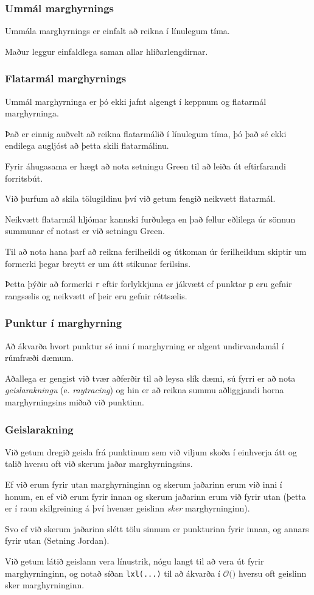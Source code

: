 {
	\frametitle{Ummál marghyrnings}
	{
		\item<1-> Ummála marghyrnings er einfalt að reikna í línulegum tíma.
		\item<2-> Maður leggur einfaldlega saman allar hliðarlengdirnar.
		\item<3->[] 
	}
}

{
	\frametitle{Flatarmál marghyrnings}
	{
		\item<1-> Ummál marghyrninga er þó ekki jafnt algengt í keppnum og flatarmál marghyrninga.
		\item<2-> Það er einnig auðvelt að reikna flatarmálið í línulegum tíma, þó það sé ekki
			endilega augljóst að þetta skili flatarmálinu.
		\item<3-> Fyrir áhugasama er hægt að nota setningu Green til að leiða út eftirfarandi forritsbút.
		\item<4->[] 
	}
}

{
	{
		\item<1-> Við þurfum að skila tölugildinu því við getum fengið neikvætt flatarmál.
		\item<2-> Neikvætt flatarmál hljómar kannski furðulega en það fellur eðlilega úr sönnun summunar
			ef notast er við setningu Green.
		\item<3-> Til að nota hana þarf að reikna ferilheildi og útkoman úr ferilheildum skiptir
			um formerki þegar breytt er um átt stikunar ferilsins.
		\item<4-> Þetta þýðir að formerki \texttt{r} eftir forlykkjuna er jákvætt ef punktar \texttt{p} 
			eru gefnir rangsælis og neikvætt ef þeir eru gefnir réttsælis.
	}
}

{
	\frametitle{Punktur í marghyrning}
	{
		\item<1-> Að ákvarða hvort punktur sé inni í marghyrning er algent undirvandamál í rúmfræði dæmum.
		\item<2-> Aðallega er gengist við tvær aðferðir til að leysa slík dæmi, sú fyrri er að nota \emph{geislarakningu}
			(e. \emph{raytracing}) og hin er að reikna summu aðliggjandi horna marghyrningsins miðað við punktinn.
	}
}

{
	\frametitle{Geislarakning}
	{
		\item<1-> Við getum dregið geisla frá punktinum sem við viljum skoða í einhverja átt og talið hversu oft
			við skerum jaðar marghyrningsins. 
		\item<2-> Ef við erum fyrir utan marghyrninginn og skerum jaðarinn erum við inni í honum,
			en ef við erum fyrir innan og skerum jaðarinn erum við fyrir utan (þetta er í raun skilgreining
			á því hvenær geislinn \emph{sker} marghyrninginn).
		\item<3-> Svo ef við skerum jaðarinn slétt tölu sinnum er punkturinn fyrir innan, og annars fyrir utan (Setning Jordan).
		\item<4-> Við getum látið geislann vera línustrik, nógu langt til að vera út fyrir marghyrninginn, og
			notað síðan \texttt{lxl(...)} til að ákvarða í $\mathcal{O}($$)$ hversu oft geislinn sker marghyrninginn.
	}
}

